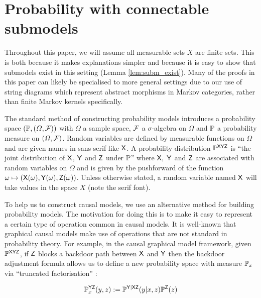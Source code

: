 

\section{Probability with connectable submodels}

Throughout this paper, we will assume all measurable sets $X$ are finite sets. This is both because it makes explanations simpler and because it is easy to show that submodels exist in this setting (Lemma \ref{lem:subm_exist}). Many of the proofs in this paper can likely be specialised to more general settings due to our use of string diagrams which represent abstract morphisms in Markov categories, rather than finite Markov kernels specifically.

The standard method of constructing probability models introduces a probability space $(\mathbb{P},(\Omega,\mathcal{F}))$ with $\Omega$ a sample space, $\mathcal{F}$ a $\sigma$-algebra on $\Omega$ and $\mathbb{P}$ a probability measure on $(\Omega,\mathcal{F})$. Random variables are defined by measurable functions on $\Omega$ and are given names in sans-serif like $\mathsf{X}$. A probability distribution $\mathbb{P}^{\mathsf{XYZ}}$ is ``the joint distribution of $\mathsf{X}$, $\mathsf{Y}$ and $\mathsf{Z}$ under $\mathbb{P}$'' where $\mathsf{X},$ $\mathsf{Y}$ and $\mathsf{Z}$ are associated with random variables on $\Omega$ and is given by the pushforward of the function $\omega\mapsto (\mathsf{X}(\omega),\mathsf{Y}(\omega),\mathsf{Z}(\omega))$. Unless otherwise stated, a random variable named $\mathsf{X}$ will take values in the space $X$ (note the serif font).

To help us to construct causal models, we use an alternative method for building probability models. The motivation for doing this is to make it easy to represent a certain type of operation common in causal models. It is well-known that graphical causal models make use of operations that are not standard in probability theory. For example, in the causal graphical model framework, given $\mathbb{P}^{\mathsf{XYZ}}$, if $\mathsf{Z}$ blocks a backdoor path between $\mathsf{X}$ and $\mathsf{Y}$ then the backdoor adjustment formula allows us to define a new probability space with measure $\mathbb{P}_x$ via ``truncated factorisation'' \citep[page ~24]{pearl_causality:_2009}:

\begin{align}
	\mathbb{P}^{\mathsf{YZ}}_{x}(y,z):=\mathbb{P}^{\mathsf{Y|XZ}}(y|x,z)\mathbb{P}^{\mathsf{Z}}(z)\label{eq:truncated_fac}
\end{align}

